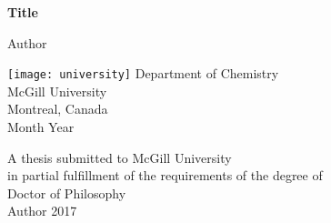 \begin{titlepage}
    \begin{center}
        \vspace*{0.5mm}
        
        \Huge\sffamily
        \textbf{Title}
      
        \vspace{0.5cm}
        \huge        
        \vspace{1cm}
                
        Author
        
        \vspace{1.5cm}
        
        \texttt{[image: university]}
        \begingroup\singlespacing
        \vspace{-1cm} 
        \Large
        Department of Chemistry\\
        McGill University\\
        Montreal, Canada\\
        \vspace{5mm} Month Year\\
        \endgroup
        
        \vspace{0.5cm}
        \begingroup\singlespacing\large
        A thesis submitted to McGill University\\
        in partial fulfillment of the requirements of the degree of\\
        Doctor of Philosophy\\
        \vspace{0.5cm}        
        \textcopyright \hspace{0.1 cm} Author 2017\\
        \endgroup
        
    \end{center}
\end{titlepage}